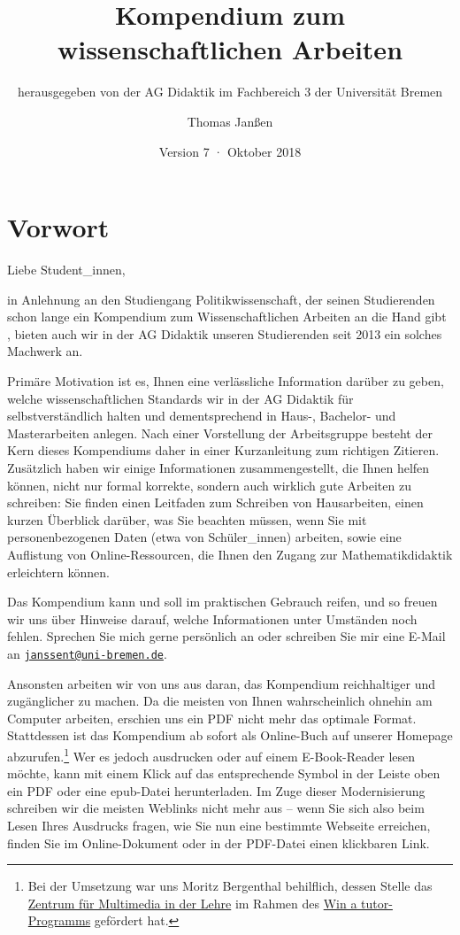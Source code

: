 \documentclass[ngerman,bibliography=totoc,oneside,12pt,a4paper]{scrbook}
\title{Kompendium zum wissenschaftlichen Arbeiten}
\subtitle{herausgegeben von der AG Didaktik im Fachbereich 3 der Universität
Bremen}
\author{Thomas Janßen}
\date{Version 7 · Oktober 2018}
\begin{document}
\maketitle

{
\setcounter{tocdepth}{1}
\tableofcontents
}
\chapter*{Vorwort}\label{vorwort}

Liebe Student\_innen,

in Anlehnung an den Studiengang Politikwissenschaft, der seinen
Studierenden schon lange ein Kompendium zum Wissenschaftlichen Arbeiten
an die Hand gibt \autocite{autorengruppe2012}, bieten auch wir in der AG
Didaktik unseren Studierenden seit 2013 ein solches Machwerk an.

Primäre Motivation ist es, Ihnen eine verlässliche Information darüber
zu geben, welche wissenschaftlichen Standards wir in der AG Didaktik für
selbstverständlich halten und dementsprechend in Haus-, Bachelor- und
Masterarbeiten anlegen. Nach einer Vorstellung der Arbeitsgruppe besteht
der Kern dieses Kompendiums daher in einer Kurzanleitung zum richtigen
Zitieren. Zusätzlich haben wir einige Informationen zusammengestellt,
die Ihnen helfen können, nicht nur formal korrekte, sondern auch
wirklich gute Arbeiten zu schreiben: Sie finden einen Leitfaden zum
Schreiben von Hausarbeiten, einen kurzen Überblick darüber, was Sie
beachten müssen, wenn Sie mit personenbezogenen Daten (etwa von
Schüler\_innen) arbeiten, sowie eine Auflistung von Online-Ressourcen,
die Ihnen den Zugang zur Mathematikdidaktik erleichtern können.

Das Kompendium kann und soll im praktischen Gebrauch reifen, und so
freuen wir uns über Hinweise darauf, welche Informationen unter
Umständen noch fehlen. Sprechen Sie mich gerne persönlich an oder
schreiben Sie mir eine E-Mail an
\href{mailto:janssent@uni-bremen.de}{\nolinkurl{janssent@uni-bremen.de}}.

Ansonsten arbeiten wir von uns aus daran, das Kompendium reichhaltiger
und zugänglicher zu machen. Da die meisten von Ihnen wahrscheinlich
ohnehin am Computer arbeiten, erschien uns ein PDF nicht mehr das
optimale Format. Stattdessen ist das Kompendium ab sofort als
Online-Buch auf unserer Homepage abzurufen.\footnote{Bei der Umsetzung
  war uns Moritz Bergenthal behilflich, dessen Stelle das
  \href{https://www.uni-bremen.de/zmml/}{Zentrum für Multimedia in der
  Lehre} im Rahmen des
  \href{https://www.uni-bremen.de/zmml/projekte/win-a-tutor-e-learning-anwendungsszenarien/}{Win
  a tutor-Programms} gefördert hat.} Wer es jedoch ausdrucken oder auf
einem E-Book-Reader lesen möchte, kann mit einem Klick auf das
entsprechende Symbol in der Leiste oben ein PDF oder eine epub-Datei
herunterladen. Im Zuge dieser Modernisierung schreiben wir die meisten
Weblinks nicht mehr aus -- wenn Sie sich also beim Lesen Ihres Ausdrucks
fragen, wie Sie nun eine bestimmte Webseite erreichen, finden Sie im
Online-Dokument oder in der PDF-Datei einen klickbaren Link.
\end{document}
